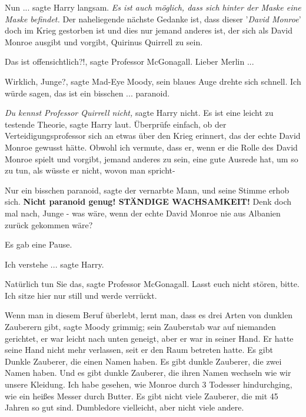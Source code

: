 \glqq{}Nun ...\grqq{} sagte Harry langsam.
\emph{Es ist auch möglich, dass sich hinter der Maske eine Maske befindet.}
\glqq{}Der naheliegende nächste Gedanke ist, dass dieser '\emph{David Monroe}'
doch im Krieg gestorben ist und dies nur jemand anderes ist, der sich als David
Monroe ausgibt und vorgibt, Quirinus Quirrell zu sein.\grqq{}

\glqq{}Das ist offensichtlich?!\grqq{}, sagte Professor McGonagall. \glqq{}Lieber
Merlin ...\grqq{}

\glqq{}Wirklich, Junge?\grqq{}, sagte Mad-Eye Moody, sein blaues Auge drehte sich
schnell. \glqq{}Ich würde sagen, das ist ein bisschen ... paranoid.\grqq{}

\emph{Du kennst Professor Quirrell nicht,} sagte Harry nicht. \glqq{}Es ist eine
leicht zu testende Theorie\grqq{}, sagte Harry laut. \glqq{}Überprüfe einfach, ob
der Verteidigungsprofessor sich an etwas über den Krieg erinnert, das der echte
David Monroe gewusst hätte. Obwohl ich vermute, dass er, wenn er die Rolle des
David Monroe spielt und vorgibt, jemand anderes zu sein, eine gute Ausrede hat,
um so zu tun, als wüsste er nicht, wovon man spricht-\grqq{}

\glqq{}Nur ein bisschen paranoid\grqq{}, sagte der vernarbte Mann, und seine
Stimme erhob sich. \glqq{}\textbf{Nicht paranoid genug! STÄNDIGE WACHSAMKEIT!}
Denk doch mal nach, Junge - was wäre, wenn der echte David Monroe nie aus
Albanien zurück gekommen wäre?\grqq{}

Es gab eine Pause.

\glqq{}Ich verstehe ...\grqq{} sagte Harry.

\glqq{}Natürlich tun Sie das\grqq{}, sagte Professor McGonagall. \glqq{}Lasst euch
nicht stören, bitte. Ich sitze hier nur still und werde verrückt.\grqq{}

\glqq{}Wenn man in diesem Beruf überlebt, lernt man, dass es drei Arten von
dunklen Zauberern gibt\grqq{}, sagte Moody grimmig; sein Zauberstab war auf
niemanden gerichtet, er war leicht nach unten geneigt, aber er war in seiner
Hand. Er hatte seine Hand nicht mehr verlassen, seit er den Raum betreten hatte.
\glqq{}Es gibt Dunkle Zauberer, die einen Namen haben. Es gibt dunkle Zauberer,
die zwei Namen haben. Und es gibt dunkle Zauberer, die ihren Namen wechseln wie
wir unsere Kleidung. Ich habe gesehen, wie \glqq{}Monroe\grqq{} durch 3 Todesser
hindurchging, wie ein heißes Messer durch Butter. Es gibt nicht viele Zauberer,
die mit 45 Jahren so gut sind. Dumbledore vielleicht, aber nicht viele
andere.\grqq{}

